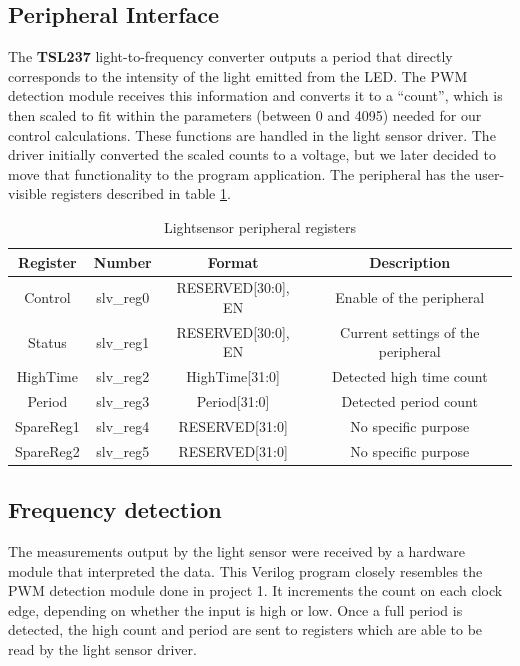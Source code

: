 \documentclass[11pt]{article}
\begin{document}
  


\subsection{Peripheral Interface}
The \textbf{TSL237} light-to-frequency converter outputs a period that directly corresponds to the intensity of the light emitted from the LED.  The PWM detection module receives this information and converts it to a ``count'', which is then scaled to fit within the parameters (between 0 and 4095) needed for our control calculations.  These functions are handled in the light sensor driver.  The driver initially converted the scaled counts to a voltage, but we later decided to move that functionality to the program application.
The peripheral has the user-visible registers described in table \ref{registers}.

	\begin {table}[H]
	\begin {center} 
	\vspace{15pt}
	
	\begin{tabular}{||c|c|c|c||}\hline
		\textbf{Register}	&	\textbf{Number}	&	\textbf{Format} 	& 	\textbf{Description}		\\\hline
		Control				&	slv\_reg0		&	{RESERVED[30:0], EN} &  Enable of the peripheral 		\\\hline
		Status				&	slv\_reg1		&	{RESERVED[30:0], EN} & Current settings of the peripheral		\\\hline
		HighTime			&	slv\_reg2		&    HighTime[31:0] 	&	Detected high time count  			\\\hline
		Period				&	slv\_reg3		&  	Period[31:0] 		&	Detected period count 			\\\hline
		SpareReg1			&	slv\_reg4		&	RESERVED[31:0] 		& 	No specific purpose 			\\\hline
		SpareReg2			&	slv\_reg5		&	RESERVED[31:0] 		& 	No specific purpose 			\\\hline
	\end{tabular}
		\caption {Lightsensor peripheral registers} \label{registers}
	\end{center}
	\end{table} 
	

\subsection{Frequency detection}
The measurements output by the light sensor were received by a hardware module that interpreted the data.  This Verilog program closely resembles the PWM detection module done in project 1.  It increments the count on each clock edge, depending on whether the input is high or low.  Once a full period is detected, the high count and period are sent to registers which are able to be read by the light sensor driver.  
\end{document}
